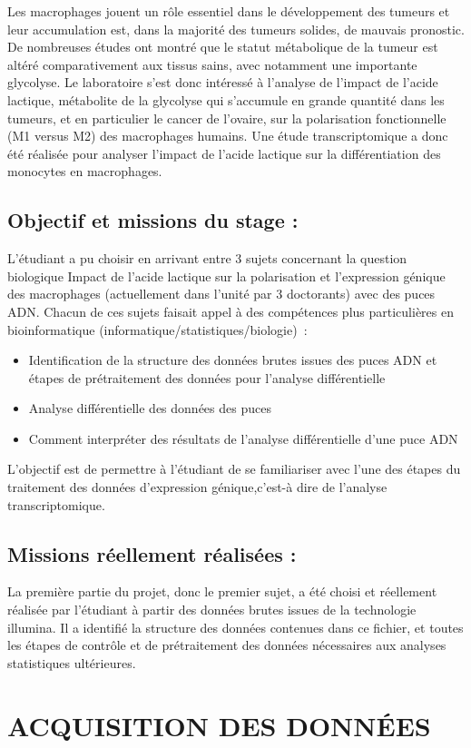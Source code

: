 \documentclass[a4paper,10pt]{article}
\begin{document}
Les macrophages jouent un rôle essentiel dans le développement des tumeurs et leur accumulation est, dans la majorité des tumeurs solides, de mauvais pronostic. De nombreuses études ont montré que le statut métabolique de la tumeur est altéré comparativement aux tissus sains, avec notamment une importante glycolyse. Le laboratoire s’est donc intéressé à l’analyse de l’impact de l’acide lactique, métabolite de la glycolyse qui s’accumule en grande quantité dans les tumeurs, et en particulier le cancer de l’ovaire, sur la polarisation fonctionnelle (M1 versus M2) des macrophages humains.
Une étude transcriptomique a donc été réalisée pour analyser l’impact de l’acide lactique sur la différentiation des monocytes en macrophages.
\subsection{Objectif et missions du stage :}
L’étudiant a pu choisir en arrivant entre 3 sujets concernant la question biologique \textgravedbl Impact de l’acide lactique sur la polarisation et l’expression génique des macrophages \textacutedbl (actuellement dans l’unité par 3 doctorants)  avec des puces ADN. Chacun de ces sujets faisait appel à des compétences plus particulières en bioinformatique (informatique/statistiques/biologie) :
\begin{itemize}
 \item Identification de la structure des données brutes issues des puces ADN et étapes de prétraitement des données pour l’analyse différentielle 
\item Analyse différentielle des données des puces 
\item Comment interpréter des résultats de l’analyse différentielle d’une puce ADN 
\end{itemize}
L’objectif est de permettre à l’étudiant de se familiariser avec l’une des étapes du traitement des données d’expression génique,c'est-à dire de l'analyse transcriptomique.
\subsection{Missions réellement réalisées :}
La première partie du projet, donc le premier sujet, a été choisi et réellement réalisée par l’étudiant à partir des données brutes issues de la technologie illumina. 
Il a identifié la structure des données contenues dans ce fichier, et toutes les étapes de contrôle et de prétraitement des données nécessaires aux analyses statistiques ultérieures.
\section{ACQUISITION DES DONN\'{E}ES }
\end{document}
